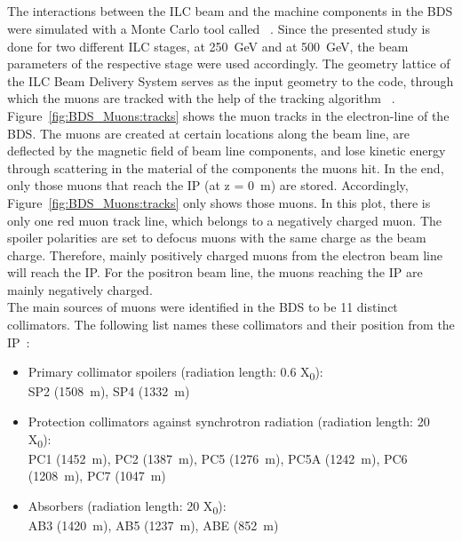 \subsection{\mucarlo}
\label{BDS_Muons:MUCARLO}
The interactions between the ILC beam and the machine components in the BDS were simulated with a Monte Carlo tool called \mucarlo~\cite{Mucarlo,MuonBkg_05TeV,MuonBkg_1TeV}.
Since the presented study is done for two different ILC stages, at \SI{250}{\GeV} and at \SI{500}{\GeV}, the beam parameters of the respective stage were used accordingly.
The geometry lattice of the ILC Beam Delivery System serves as the input geometry to the \mucarlo code, through which the muons are tracked with the help of the tracking algorithm \turtle~\cite{Turtle}.
Figure~\ref{fig:BDS_Muons:tracks} shows the muon tracks in the electron-line of the BDS.
The muons are created at certain locations along the beam line, are deflected by the magnetic field of beam line components, and lose kinetic energy through scattering in the material of the components the muons hit.
In the end, only those muons that reach the IP (at z = \SI{0}{\meter}) are stored.
Accordingly, Figure~\ref{fig:BDS_Muons:tracks} only shows those muons.
In this plot, there is only one red muon track line, which belongs to a negatively charged muon.
The spoiler polarities are set to defocus muons with the same charge as the beam charge.
Therefore, mainly positively charged muons from the electron beam line will reach the IP.
For the positron beam line, the muons reaching the IP are mainly negatively charged.
\\The main sources of muons were identified in the BDS to be 11 distinct collimators.
The following list names these collimators and their position from the IP~\cite{Lewis}:
\begin{itemize}
 \item Primary collimator spoilers (radiation length: 0.6 X\textsubscript{0}):\\
  SP2 (\SI{1508}{\meter}), SP4 (\SI{1332}{\meter})
 \item Protection collimators against synchrotron radiation (radiation length: 20 X\textsubscript{0}):\\
  PC1 (\SI{1452}{\meter}), PC2 (\SI{1387}{\meter}), PC5 (\SI{1276}{\meter}), PC5A (\SI{1242}{\meter}), PC6 (\SI{1208}{\meter}), PC7 (\SI{1047}{\meter})
 \item Absorbers (radiation length: 20 X\textsubscript{0}):\\ %
  AB3 (\SI{1420}{\meter}), AB5 (\SI{1237}{\meter}), ABE (\SI{852}{\meter})
\end{itemize}
